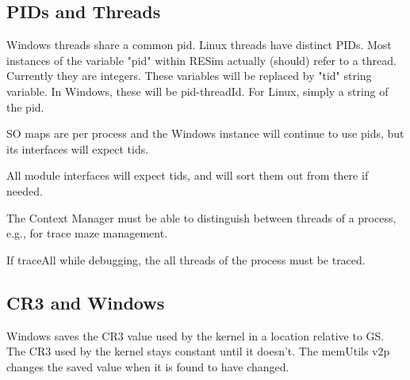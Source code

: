 \documentclass[titlepage]{article}
\begin{document}
\begin{appendices}
\subsection{PIDs and Threads}
Windows threads share a common pid. Linux threads have distinct PIDs.
Most instances of the variable "pid" within RESim actually (should) refer to a thread.
Currently they are integers.
These variables will be replaced by "tid" string variable.  In Windows, these will
be pid-threadId.  For Linux, simply a string of the pid.

SO maps are per process and the Windows instance will continue to use pids, but its
interfaces will expect tids.

All module interfaces will expect tids, and will sort them out from there if needed.

The Context Manager must be able to distinguish between threads of a process, e.g., for trace maze management.

If traceAll while debugging, the all threads of the process must be traced.

\subsection{CR3 and Windows}
Windows saves the CR3 value used by the kernel in a location relative to GS.
The CR3 used by the kernel stays constant until it doesn't.  The memUtils v2p
changes the saved value when it is found to have changed. 


\end{appendices}
\end{document}
